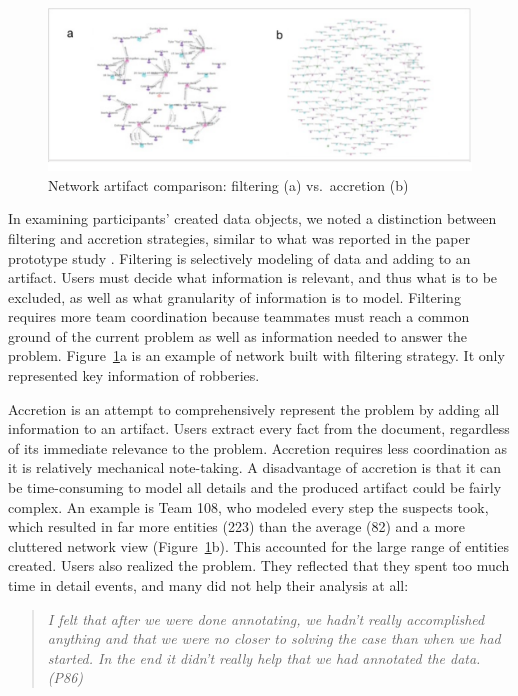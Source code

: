 \begin{figure}
	\centering
	\includegraphics[width=\columnwidth]{./04-Study_one/img/network_accretion_filter.png}
	\caption{Network artifact comparison: filtering (a)
		vs.~accretion (b) \label{fig:network_accretion}}
\end{figure}

In examining participants' created data objects,
we noted a distinction between filtering and accretion
strategies, similar to what was reported in the paper prototype study \citep{Carroll2013}. Filtering is selectively modeling of data
and adding to an artifact. Users must decide what information is
relevant, and thus what is to be excluded, as well as what granularity
of information is to model. Filtering requires more team coordination
because teammates must reach a common ground of the current problem as
well as information needed to answer the problem. Figure~\ref{fig:network_accretion}a is an example of network built with filtering strategy. It only represented key information of robberies.

Accretion is an attempt to comprehensively represent the problem by
adding all information to an artifact. Users extract every fact from the
document, regardless of its immediate relevance to the problem.
Accretion requires less coordination as it is relatively mechanical note-taking. A disadvantage of accretion is that it can be time-consuming
to model all details and the produced artifact could be fairly complex.
An example is Team 108, who modeled
every step the suspects took, which resulted in far more entities (223) than
the average (82) and a more cluttered network view (Figure~\ref{fig:network_accretion}b). This accounted for the large range of entities created. Users also realized the problem. They reflected that they spent too
much time in detail events, and many did not help their analysis at all:

\begin{quote}
	\emph{I felt that after we were done annotating, we hadn't really accomplished
		anything and that we were no closer to solving the case than when we had
		started. In the end it didn't really help that we had annotated the
		data. (P86)}
\end{quote}

